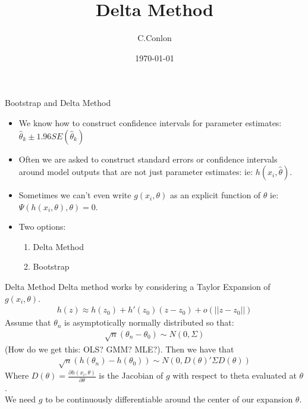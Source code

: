 

\title [Bootstrap]{Delta Method}
\author{C.Conlon}
\date{\today}


\begin{frame}
\titlepage
\end{frame}


\begin{frame}{Bootstrap and Delta Method}
\begin{itemize}
\item We know how to construct confidence intervals for parameter estimates:  $\hat{\theta}_k \pm 1.96 SE(\hat{\theta}_k)$
\item Often we are asked to construct standard errors or confidence intervals around model outputs that are not just parameter estimates: ie:  $h(x_i,\hat{\theta})$.
\item Sometimes we can't even write $g(x_i,\theta)$ as an explicit function of $\theta$ ie: $\Psi(h(x_i,\theta),\theta) = 0$.
\item Two options:
\begin{enumerate}
\item Delta Method
\item Bootstrap
\end{enumerate}
\end{itemize}
\end{frame}

\begin{frame}{Delta Method}
Delta method works by considering a \alert{Taylor Expansion} of $g(x_i,\theta)$.
\begin{eqnarray*}
h(z) \approx h(z_0) + h'(z_0)(z-z_0) + o(||z-z_0||)
\end{eqnarray*}
Assume that $\theta_n$ is asymptotically normally distributed so that:
\begin{eqnarray*}
\sqrt{n} (\theta_n - \theta_0) \sim N(0,\Sigma)
\end{eqnarray*}
(How do we get this: OLS? GMM? MLE?). Then we have that 
\begin{eqnarray*}
\sqrt{n} (h(\theta_n) - h(\theta_0)) \sim N(0,D(\theta)' \Sigma  D(\theta))
\end{eqnarray*}
Where $D(\theta) = \frac{\partial h(x_i, \theta)}{\partial \theta}$ is the Jacobian of $g$ with respect to theta evaluated at $\theta$.\\
We need $g$ to be continuously differentiable around the center of our expansion $\theta$.
\end{frame}


